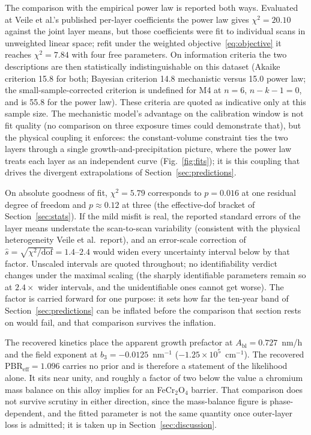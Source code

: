 \documentclass[a4paper,fleqn]{cas-sc}
\begin{document}
The comparison with the empirical power law is reported both ways.
Evaluated at Veile et al.'s published per-layer coefficients the power
law gives $\chi^2 = 20.10$ against the joint layer means, but those
coefficients were fit to individual scans in unweighted linear space;
refit under the weighted objective~\eqref{eq:objective} it reaches
$\chi^2 = 7.84$ with four free parameters. On information criteria the
two descriptions are then statistically indistinguishable on this
dataset (Akaike criterion 15.8 for both; Bayesian criterion 14.8
mechanistic versus 15.0 power law; the small-sample-corrected criterion
is undefined for M4 at $n=6$, $n-k-1=0$, and is 55.8 for the power
law). These criteria are quoted as indicative only at this sample size.
The mechanistic model's advantage on the calibration window is not fit
quality (no comparison on three exposure times could demonstrate
that), but the physical coupling it enforces: the constant-volume
constraint ties the two layers through a single
growth-and-precipitation picture, where the power law treats each layer
as an independent curve (Fig.~\ref{fig:fits}); it is this coupling that
drives the divergent extrapolations of
Section~\ref{sec:predictions}.

On absolute goodness of fit, $\chi^2 = 5.79$ corresponds to $p = 0.016$
at one residual degree of freedom and $p \approx 0.12$ at three (the
effective-dof bracket of Section~\ref{sec:stats}). If the mild misfit
is real, the reported standard errors of the layer means understate the
scan-to-scan variability (consistent with the physical heterogeneity
Veile et al.\ report), and an error-scale correction of $\hat{s} = \sqrt{\chi^2/\text{dof}} = 1.4$--$2.4$ would widen every
uncertainty interval below by that factor. Unscaled intervals are
quoted throughout; no identifiability verdict changes under the maximal
scaling (the sharply identifiable parameters remain so at $2.4\times$
wider intervals, and the unidentifiable ones cannot get worse). The
factor is carried forward for one purpose: it sets how far the ten-year
band of Section~\ref{sec:predictions} can be inflated before the
comparison that section rests on would fail, and that comparison
survives the inflation.

The recovered kinetics place the apparent growth prefactor at
$A_\text{bl} = 0.727$~nm/h and the field exponent at
$b_3 = -0.0125$~nm$^{-1}$ ($-1.25\times10^{5}$~cm$^{-1}$). The
recovered $\mathrm{PBR}_\text{eff} = 1.096$ carries no prior and is
therefore a statement of the likelihood alone. It sits near unity, and
roughly a factor of two below the value a chromium mass balance on this
alloy implies for an FeCr$_2$O$_4$ barrier. That comparison does not
survive scrutiny in either direction, since the mass-balance figure is
phase-dependent, and the fitted parameter is not the same quantity once
outer-layer loss is admitted; it is taken up in
Section~\ref{sec:discussion}.
\end{document}
